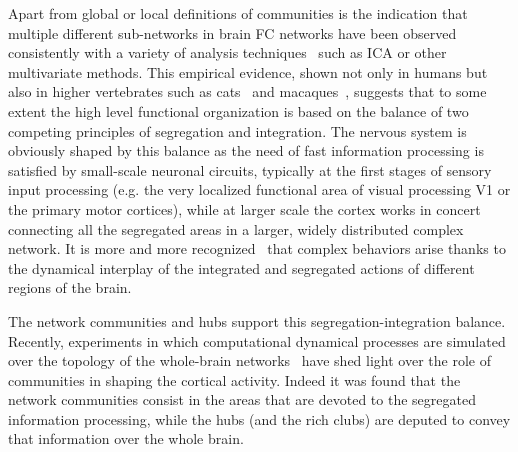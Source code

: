 Apart from global or local definitions of communities is the indication that multiple different sub-networks in brain FC networks have been observed consistently with a variety of analysis techniques~\cite{fox2005,deluca2006,schwarz2007} such as ICA or other multivariate methods.
This empirical evidence, shown not only in humans but also in higher vertebrates such as cats~\cite{scannell1995} and macaques~\cite{felleman1991}, suggests that to some extent the high level functional organization is based on the balance of two competing principles of segregation and integration.
The nervous system is obviously shaped by this balance as the need of fast information processing is satisfied by small-scale neuronal circuits, typically at the first stages of sensory input processing (e.g. the very localized functional area of visual processing V1 or the primary motor cortices), while at larger scale the cortex works in concert connecting all the segregated areas in a larger, widely distributed complex network.
It is more and more recognized~\cite{tononi1994,tononi1998,deco2015} that complex behaviors arise thanks to the dynamical interplay of the integrated and segregated actions of different regions of the brain.

The network communities and hubs support this segregation-integration balance. Recently, experiments in which computational dynamical processes are simulated over the topology of the whole-brain networks~\cite{deco2015} have shed light over the role of communities in shaping the cortical activity. Indeed it was found that the network communities consist in the areas that are devoted to the segregated information processing, while the hubs (and the rich clubs) are deputed to convey that information over the whole brain.


